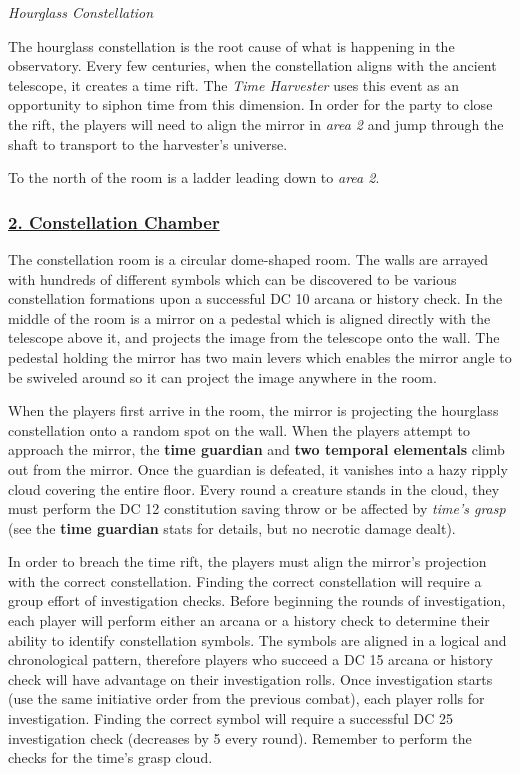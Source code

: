 \documentclass{article}
\begin{document}
\begin{multicols*}{2}
\begin{center}
		\emph{Hourglass Constellation}
	\end{center}

	The hourglass constellation is the root cause of what is happening in the observatory. Every few centuries, when the constellation aligns with the ancient telescope, it creates a time rift. The \emph{Time Harvester} uses this event as an opportunity to siphon time from this dimension. In order for the party to close the rift, the players will need to align the mirror in \emph{area 2} and jump through the shaft to transport to the harvester's universe.
	
	To the north of the room is a ladder leading down to \emph{area 2}.
	
	\subsubsection*{\underline{2. Constellation Chamber}}
	The constellation room is a circular dome-shaped room. The walls are arrayed with hundreds of different symbols which can be discovered to be various constellation formations upon a successful DC 10 arcana or history check. In the middle of the room is a mirror on a pedestal which is aligned directly with the telescope above it, and projects the image from the telescope onto the wall. The pedestal holding the mirror has two main levers which enables the mirror angle to be swiveled around so it can project  the image anywhere in the room.
	
	When the players first arrive in the room, the mirror is projecting the hourglass constellation onto a random spot on the wall. When the players attempt to approach the mirror, the \textbf{time guardian} and  \textbf{two temporal elementals} climb out from the mirror. Once the guardian is defeated, it vanishes into a hazy ripply cloud covering the entire floor. Every round a creature stands in the cloud, they must perform the DC 12 constitution saving throw or be affected by \emph{time's grasp} (see the \textbf{time guardian} stats for details, but no necrotic damage dealt).
	
	In order to breach the time rift, the players must align the mirror's projection with the correct constellation. Finding the correct constellation will require a group effort of investigation checks. Before beginning the rounds of investigation, each player will perform either an arcana or a history check to determine their ability to identify constellation symbols. The symbols are aligned in a logical and chronological pattern, therefore players who succeed a DC 15 arcana or history check will have advantage on their investigation rolls. Once investigation starts (use the same initiative order from the previous combat), each player rolls for investigation. Finding the correct symbol will require a successful DC 25 investigation check (decreases by 5 every round). Remember to perform the checks for the time's grasp cloud.
	 

\end{multicols*}
\end{document}
